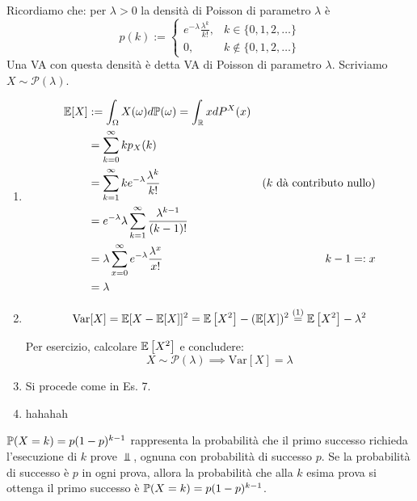 Ricordiamo che: per $\lambda  >0$ la densità di Poisson di parametro $\lambda $ è
\begin{equation*}
p( k) :=\begin{cases}
e^{-\lambda }\frac{\lambda ^{k}}{k!} , & k\in \{0,1,2,\dots \}\\
0, & k\notin \{0,1,2,\dots \}
\end{cases}
\end{equation*}
Una VA con questa densità è detta VA di Poisson di parametro $\lambda $. Scriviamo $X\sim \mathcal{P}( \lambda )$.
\begin{enumerate}
\item \begin{equation*}
\begin{aligned}
\mathbb{E}[ X] & :=\int _{\Omega } X( \omega ) d\mathbb{P}( \omega ) =\int _{\mathbb{R}} xdP^{X}( x) & \\
 & =\sum\limits _{k=0}^{\infty } kp_{X}( k) & \\
 & =\sum\limits _{k=1}^{\infty } ke^{-\lambda }\frac{\lambda ^{k}}{k!} & \text{(} k\ \text{dà contributo nullo)}\\
 & =e^{-\lambda } \lambda \sum\limits _{k=1}^{\infty }\frac{\lambda ^{k-1}}{( k-1) !} & \\
 & =\lambda \sum\limits _{x=0}^{\infty } e^{-\lambda }\frac{\lambda ^{x}}{x!} & k-1=:x\\
 & =\lambda  & 
\end{aligned}
\end{equation*}
\item \begin{equation*}
\mathrm{Var}[ X] =\mathbb{E}[ X-\mathbb{E}[ X]]^{2} =\mathbb{E}\left[ X^{2}\right] -(\mathbb{E}[ X])^{2}\overset{( 1)}{=}\mathbb{E}\left[ X^{2}\right] -\lambda ^{2}
\end{equation*}

Per esercizio, calcolare $\mathbb{E}\left[ X^{2}\right]$ e concludere:\begin{equation*}
X\sim \mathcal{P}( \lambda ) \implies \mathrm{Var}[ X] =\lambda 
\end{equation*}
\item Si procede come in Es. 7.
\item hahahah
\end{enumerate}
\Soluzione
\begin{oss}
$\mathbb{P}( X=k) =p( 1-p)^{k-1}$ rappresenta la probabilità che il primo successo richieda l'esecuzione di $k$ prove $\Bot $, ognuna con probabilità di successo $p$. Se la probabilità di successo è $p$ in ogni prova, allora la probabilità che alla $k$ esima prova si ottenga il primo successo è $\mathbb{P}( X=k) =p( 1-p)^{k-1}$.
\end{oss}
